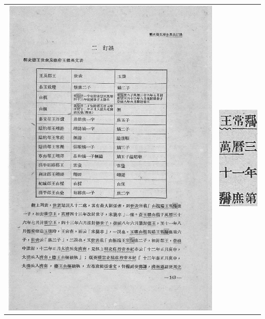 \documentclass{article}
\begin{document}
\begin{center}
    \begin{tabular}{ c c }
        \includegraphics[height=.9\textheight]{5-000.jpg} & \includegraphics{5-000-crop.png}
    \end{tabular}
    \label{mingshidewangfu}
\end{center}
\end{document}
